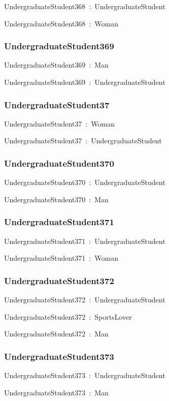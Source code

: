 \documentclass{article}
\begin{document}
UndergraduateStudent368~:~UndergraduateStudent

UndergraduateStudent368~:~Woman

\subsubsection*{UndergraduateStudent369}

UndergraduateStudent369~:~Man

UndergraduateStudent369~:~UndergraduateStudent

\subsubsection*{UndergraduateStudent37}

UndergraduateStudent37~:~Woman

UndergraduateStudent37~:~UndergraduateStudent

\subsubsection*{UndergraduateStudent370}

UndergraduateStudent370~:~UndergraduateStudent

UndergraduateStudent370~:~Man

\subsubsection*{UndergraduateStudent371}

UndergraduateStudent371~:~UndergraduateStudent

UndergraduateStudent371~:~Woman

\subsubsection*{UndergraduateStudent372}

UndergraduateStudent372~:~UndergraduateStudent

UndergraduateStudent372~:~SportsLover

UndergraduateStudent372~:~Man

\subsubsection*{UndergraduateStudent373}

UndergraduateStudent373~:~UndergraduateStudent

UndergraduateStudent373~:~Man
\end{document}
